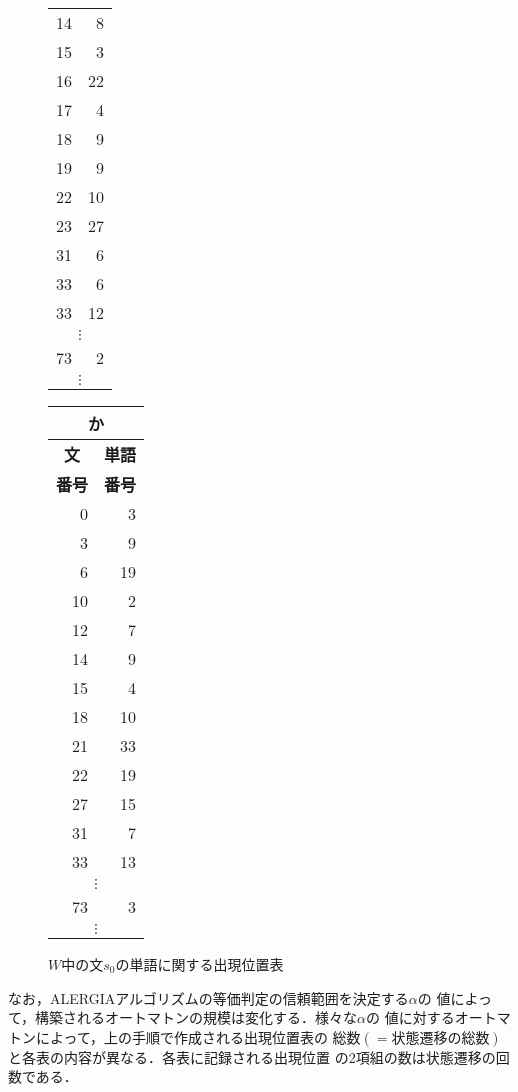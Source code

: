\begin{figure}[hbt]
\begin{center}
\begin{footnotesize}
\begin{minipage}[t]{3cm}
\begin{tabular}[t]{|r|r|}
	14 & 8\\
	15 & 3\\
	16 & 22\\
	17 & 4\\
	18 & 9\\
	19 & 9\\
	22 & 10\\
	23 & 27\\
	31 & 6\\
	33 & 6\\
	33 & 12\\
	\multicolumn{2}{|c|}{$\vdots$}\\
	73 & 2\\
	\multicolumn{2}{|c|}{$\vdots$}\\
	\end{tabular}
	\end{minipage} \quad
	\begin{minipage}[t]{3cm}
	\begin{tabular}[t]{|r|r|}
	\multicolumn{2}{c}{\bf か}\\
	\hline
	\multicolumn{1}{|c|}{\bf 文} & \multicolumn{1}{c|}{\bf 単語}\\
	\multicolumn{1}{|c|}{\bf 番号} & \multicolumn{1}{c|}{\bf 番号}\\
	\hline
	0 & 3\\
	3 & 9\\
	6 & 19\\
	10 & 2\\
	12 & 7\\
	14 & 9\\
	15 & 4\\
	18 & 10\\
	21 & 33\\
	22 & 19\\
	27 & 15\\
	31 & 7\\
	33 & 13\\
	\multicolumn{2}{|c|}{$\vdots$}\\
	73 & 3\\
	\multicolumn{2}{|c|}{$\vdots$}\\
	\end{tabular}
	\end{minipage}
\end{footnotesize}
\end{center}
\caption{$W$中の文$s_0$の単語に関する出現位置表}
\label{Fig:edgeattr}
\end{figure}

なお，ALERGIAアルゴリズムの等価判定の信頼範囲を決定する\hspace{-0.2mm}$\alpha$\hspace{-0.2mm}の
値によって，構築されるオートマトンの規模は変化する．様々な\hspace{-0.2mm}$\alpha$\hspace{-0.2mm}の
値に対するオートマトンによって，上の手順で作成される出現位置表の
総数\((=状態遷移の総数)\)と各表の内容が異なる．各表に記録される出現位置
の2項組の数は状態遷移の回数である．


